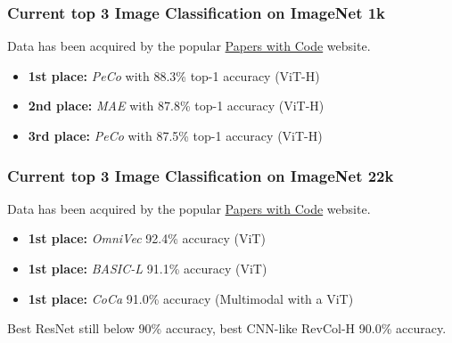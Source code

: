 \begin{frame}
\frametitle{Current top 3 Image Classification on ImageNet 1k}
Data has been acquired by the popular \href{https://paperswithcode.com/sota/image-classification-on-imagenet?tag_filter=171}{Papers with Code} website.


\begin{itemize}
    \item \textbf{1st place:} \textit{PeCo} with 88.3\% top-1 accuracy (ViT-H)
    \item \textbf{2nd place:} \textit{MAE} with 87.8\% top-1 accuracy (ViT-H)
    \item \textbf{3rd place:} \textit{PeCo} with 87.5\% top-1 accuracy (ViT-H)
\end{itemize}

\end{frame}

\begin{frame}
\frametitle{Current top 3 Image Classification on ImageNet 22k}
Data has been acquired by the popular \href{https://paperswithcode.com/sota/image-classification-on-imagenet}{Papers with Code} website.


\begin{itemize}
    \item \textbf{1st place:} \textit{OmniVec} 92.4\% accuracy (ViT)
    \item \textbf{1st place:} \textit{BASIC-L} 91.1\% accuracy (ViT)
    \item \textbf{1st place:} \textit{CoCa} 91.0\% accuracy (Multimodal with a ViT)
\end{itemize}

Best ResNet still below 90\% accuracy, best CNN-like RevCol-H 90.0\% accuracy.

\end{frame}